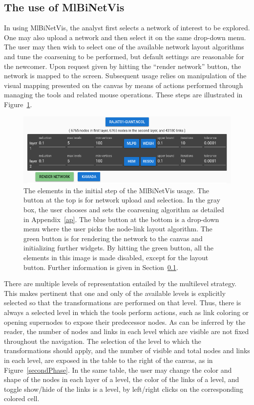 \documentclass[runningheads]{llncs}
\begin{document}
\subsection{The use of MlBiNetVis}\label{use}
In using MlBiNetVis,
the analyst first selects a network of interest to be explored.
One may also upload a network and then select it on the same drop-down menu.
The user may then wish to select one of the available network layout
algorithms and tune the coarsening to be performed, but default settings are reasonable
for the newcomer.
Upon request given by hitting the ``render network'' button,
the network is mapped to the screen.
Subsequent usage relies on manipulation of the visual mapping presented on the
canvas by means of actions
performed through managing the tools and related mouse operations.
These steps are illustrated in Figure~\ref{initial}.
\begin{figure}\centering
 \includegraphics[width=\textwidth]{initial_}
  \caption{The elements in the initial step of the MlBiNetVis usage.
  The button at the top is for network upload and selection.
  In the gray box, the user chooses and sets the coarsening algorithm as detailed in Appendix~\ref{ap}.
  The blue button at the bottom is a drop-down menu where the user picks the node-link
  layout algorithm.
  The green button is for rendering the network to the canvas and initializing further widgets.
  By hitting the green button, all the elements in this image is made disabled, except for the layout
  button.
  Further information is given in Section~\ref{use}.
  }\label{initial}
\end{figure}

There are multiple levels of representation entailed by the multilevel strategy.
This makes pertinent that one and only of the available levels is explicitly selected
so that the transformations are performed on that level.
Thus, there is always a selected level in which the tools perform actions, such
as link coloring or opening supernodes to expose their predecessor nodes.
As can be inferred by the reader,
the number of nodes and links in each level which are visible are not fixed throughout the
navigation.
The selection of the level to which the transformations should apply, and the number
of visible and total nodes and links in each level, are exposed in the table to the right
of the canvas, as in Figure~\ref{secondPhase}.
In the same table, the user may change the color and shape of the nodes in each layer of
a level, the color of the links of a level, and toggle show/hide of the links is a level,
by left/right clicks on the corresponding colored cell.
\end{document}

